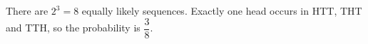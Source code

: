 There are $2^3=8$ equally likely sequences. Exactly one head occurs in HTT, THT and TTH, so the probability is $\boxed{\dfrac{3}{8}}$.
